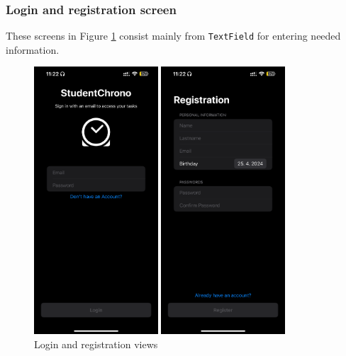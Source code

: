 \documentclass[
  biblatex,
  language=english,
  figures=false,
  sourcecodes,
  glossaries,
  index
]{kidiplom}
\begin{document}
\subsubsection{Login and registration screen}
These screens in Figure \ref{fig:image6-7} consist mainly from \texttt{TextField} for entering needed information.
\begin{figure}[h!]
\centering
\begin{minipage}[b]{0.4\textwidth}
	\includegraphics[height=10cm]{image6}
\end{minipage}
\begin{minipage}[b]{0.4\textwidth}
	\includegraphics[height=10cm]{image7}
\end{minipage}
\caption{Login and registration views}
\label{fig:image6-7}
\end{figure}
\end{document}
